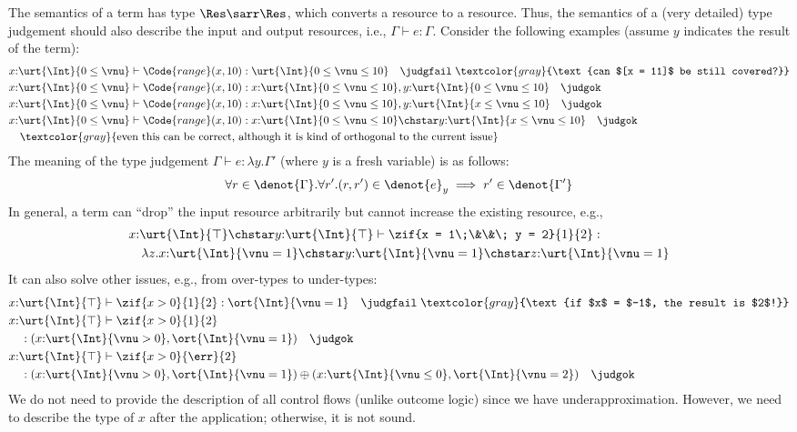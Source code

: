 The semantics of a term has type $\Res \sarr \Res$, which converts a resource to a resource. Thus, the semantics of a (very detailed) type judgement should also describe the input and output resources, i.e., $\Gamma \vdash e : \Gamma$. Consider the following examples (assume $y$ indicates the result of the term):
\begin{align*}
  &x{:}\urt{\Int}{0 \leq \vnu} \vdash \Code{range}(x, 10) : \urt{\Int}{0 \leq \vnu \leq 10} \quad \judgfail \;\textcolor{gray}{\text{can $[x = 11]$ be still covered?}}
  \\&x{:}\urt{\Int}{0 \leq \vnu} \vdash \Code{range}(x, 10) : x{:}\urt{\Int}{0 \leq \vnu \leq 10},y{:}\urt{\Int}{0 \leq \vnu \leq 10} \quad \judgok
  \\&x{:}\urt{\Int}{0 \leq \vnu} \vdash \Code{range}(x, 10) : x{:}\urt{\Int}{0 \leq \vnu \leq 10},y{:}\urt{\Int}{x \leq \vnu \leq 10} \quad \judgok
  \\&x{:}\urt{\Int}{0 \leq \vnu} \vdash \Code{range}(x, 10) : x{:}\urt{\Int}{0 \leq \vnu \leq 10} \chstar y{:}\urt{\Int}{x \leq \vnu \leq 10} \quad \judgok
  \\&\quad \textcolor{gray}{\text{even this can be correct, although it is kind of orthogonal to the current issue}}
\end{align*}\noindent
The meaning of the type judgement $\Gamma \vdash e : \lambda y.\Gamma'$ (where $y$ is a fresh variable) is as follows:
\begin{align*}
  \forall r \in \denot{\Gamma}. \forall r'. (r,r') \in \denot{e}_y \implies r' \in \denot{\Gamma'}
\end{align*}\noindent
In general, a term can ``drop'' the input resource arbitrarily but cannot increase the existing resource, e.g.,
\begin{align*}
  &x{:}\urt{\Int}{\top} \chstar y{:}\urt{\Int}{\top} \vdash \zif{x = 1\;\&\&\; y = 2}{1}{2} : 
  \\&\quad \lambda z. x{:}\urt{\Int}{\vnu = 1} \chstar y{:}\urt{\Int}{\vnu = 1} \chstar z{:}\urt{\Int}{\vnu = 1}
\end{align*}\noindent
It can also solve other issues, e.g., from over-types to under-types:
\begin{align*}
  &x{:}\urt{\Int}{\top} \vdash \zif{x > 0}{1}{2} : \ort{\Int}{\vnu = 1} \quad \judgfail \;\textcolor{gray}{\text{if $x$ = $-1$, the result is $2$!}}
  \\&x{:}\urt{\Int}{\top} \vdash \zif{x > 0}{1}{2} 
  \\&\quad : (x{:}\urt{\Int}{\vnu > 0},\ort{\Int}{\vnu = 1}) \quad \judgok
  \\&x{:}\urt{\Int}{\top} \vdash \zif{x > 0}{\err}{2} 
  \\&\quad : (x{:}\urt{\Int}{\vnu > 0},\ort{\Int}{\vnu = 1}) \oplus (x{:}\urt{\Int}{\vnu \leq 0},\ort{\Int}{\vnu = 2}) \quad \judgok
\end{align*}\noindent
We do not need to provide the description of all control flows (unlike outcome logic) since we have underapproximation. However, we need to describe the type of $x$ after the application; otherwise, it is not sound.


